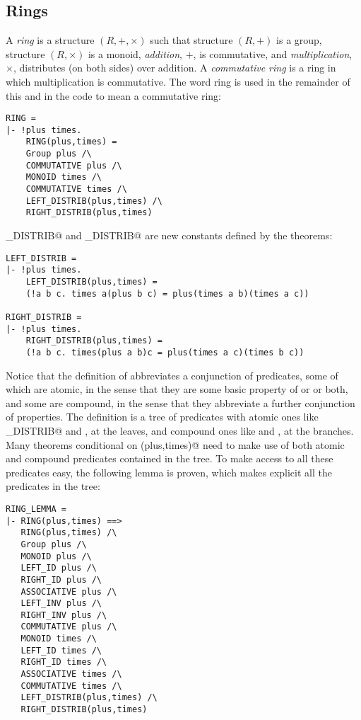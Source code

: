 \subsection{Rings}

A {\em ring} is a structure $(R,+,\times)$ such that structure $(R,+)$
is a group, structure $(R,\times)$ is a monoid, {\em addition}, $+$, is
commutative, and {\em multiplication}, $\times$, distributes (on both sides)
over addition.  A {\em commutative ring} is a ring in which multiplication
is commutative.  The word ring is used in the remainder of this \self{}
and in the \HOL{} code to mean a commutative ring:
\begin{session}
\begin{verbatim}
RING =
|- !plus times.
    RING(plus,times) =
    Group plus /\
    COMMUTATIVE plus /\
    MONOID times /\
    COMMUTATIVE times /\
    LEFT_DISTRIB(plus,times) /\
    RIGHT_DISTRIB(plus,times)
\end{verbatim}
\end{session}
\verb@LEFT_DISTRIB@ and \verb@RIGHT_DISTRIB@ are new constants
defined by the theorems:
\begin{session}
\begin{verbatim}
LEFT_DISTRIB =
|- !plus times.
    LEFT_DISTRIB(plus,times) =
    (!a b c. times a(plus b c) = plus(times a b)(times a c))

RIGHT_DISTRIB =
|- !plus times.
    RIGHT_DISTRIB(plus,times) =
    (!a b c. times(plus a b)c = plus(times a c)(times b c))
\end{verbatim}
\end{session}
Notice that the definition of \verb@RING@ abbreviates a conjunction of
predicates, some of which are atomic, in the sense that they are some basic
property of \verb@plus@ or \verb@times@ or both, and some are compound,
in the sense that they abbreviate a further conjunction of properties.
The definition is a tree of predicates with atomic ones like
\verb@LEFT_DISTRIB@ and \verb@ASSOCIATIVE@, at the leaves, and compound
ones like \verb@Group@ and \verb@MONOID@, at the branches.  Many theorems
conditional on \verb@RING(plus,times)@ need to make use of both atomic
and compound predicates contained in the tree.  To make access to all these
predicates easy, the following lemma is proven, which makes explicit all
the predicates in the tree:
\begin{session}
\begin{verbatim}
RING_LEMMA =
|- RING(plus,times) ==>
   RING(plus,times) /\
   Group plus /\
   MONOID plus /\
   LEFT_ID plus /\
   RIGHT_ID plus /\
   ASSOCIATIVE plus /\
   LEFT_INV plus /\
   RIGHT_INV plus /\
   COMMUTATIVE plus /\
   MONOID times /\
   LEFT_ID times /\
   RIGHT_ID times /\
   ASSOCIATIVE times /\
   COMMUTATIVE times /\
   LEFT_DISTRIB(plus,times) /\
   RIGHT_DISTRIB(plus,times)
\end{verbatim}
\end{session}
